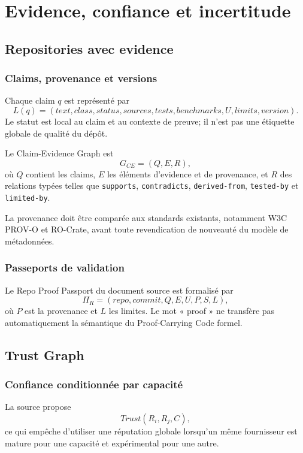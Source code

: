 \part{Evidence, confiance et incertitude}

\chapter{Repositories avec evidence}

\section{Claims, provenance et versions}
Chaque claim $q$ est représenté par
\[
L(q)=(text,class,status,sources,tests,benchmarks,U,limits,version).
\]
Le statut est local au claim et au contexte de preuve; il n'est pas une étiquette globale de qualité du dépôt.

\begin{definition}
Le Claim-Evidence Graph est
\[
G_{CE}=(Q,E,R),
\]
où $Q$ contient les claims, $E$ les éléments d'evidence et de provenance, et $R$ des relations typées telles que \texttt{supports}, \texttt{contradicts}, \texttt{derived-from}, \texttt{tested-by} et \texttt{limited-by}.
\end{definition}

La provenance doit être comparée aux standards existants, notamment W3C PROV-O et RO-Crate, avant toute revendication de nouveauté du modèle de métadonnées.

\section{Passeports de validation}
Le Repo Proof Passport du document source est formalisé par
\[
\Pi_R=(repo,commit,Q,E,U,P,S,L),
\]
où $P$ est la provenance et $L$ les limites. Le mot « proof » ne transfère pas automatiquement la sémantique du Proof-Carrying Code formel.

\chapter{Trust Graph}

\section{Confiance conditionnée par capacité}
La source propose
\[
Trust(R_i,R_j,C),
\]
ce qui empêche d'utiliser une réputation globale lorsqu'un même fournisseur est mature pour une capacité et expérimental pour une autre.

